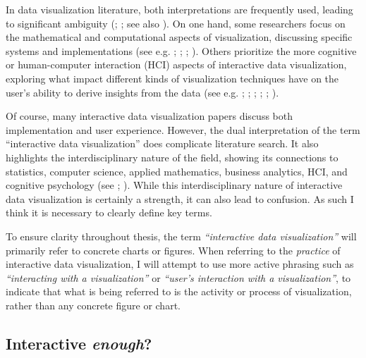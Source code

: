 \documentclass[
]{book}
\begin{document}
In data visualization literature, both interpretations are frequently used, leading to significant ambiguity (; ; see also ). On one hand, some researchers focus on the mathematical and computational aspects of visualization, discussing specific systems and implementations (see e.g. ; ; ; ). Others prioritize the more cognitive or human-computer interaction (HCI) aspects of interactive data visualization, exploring what impact different kinds of visualization techniques have on the user's ability to derive insights from the data (see e.g. ; ; ; ; ; ).

Of course, many interactive data visualization papers discuss both implementation and user experience. However, the dual interpretation of the term ``interactive data visualization'' does complicate literature search. It also highlights the interdisciplinary nature of the field, showing its connections to statistics, computer science, applied mathematics, business analytics, HCI, and cognitive psychology (see ; ). While this interdisciplinary nature of interactive data visualization is certainly a strength, it can also lead to confusion. As such I think it is necessary to clearly define key terms.

To ensure clarity throughout thesis, the term \emph{``interactive data visualization''} will primarily refer to concrete charts or figures. When referring to the \emph{practice} of interactive data visualization, I will attempt to use more active phrasing such as \emph{``interacting with a visualization''} or \emph{``user's interaction with a visualization''}, to indicate that what is being referred to is the activity or process of visualization, rather than any concrete figure or chart.

\subsection{\texorpdfstring{Interactive \emph{enough}?}{Interactive enough?}}\label{interactive-enough}
\end{document}
